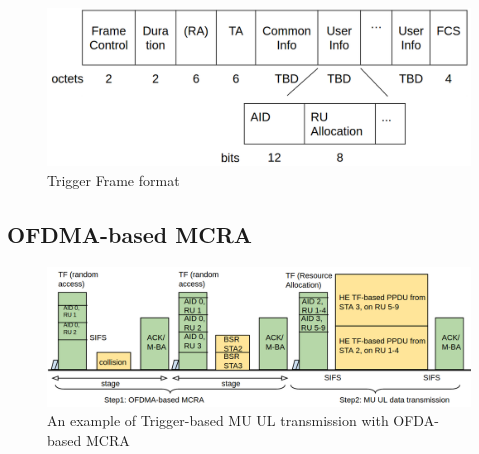 \documentclass[journal]{IEEEtran}
\begin{document}
\begin{figure}[!t]
\includegraphics[scale=0.2]{./figure/fig_tf_format.png}
\caption{Trigger Frame format}
\label{fig_TF_format}
\end{figure}




\subsection{OFDMA-based MCRA}		\label{sec_RA_illu}

\begin{figure}[!ht]
\centering
\includegraphics[scale=0.35]{./figure/RA_illu_4.png}
\caption{An example of Trigger-based MU UL transmission with OFDA-based MCRA}
\label{fig_ra_ul}
\end{figure}


\end{document}

